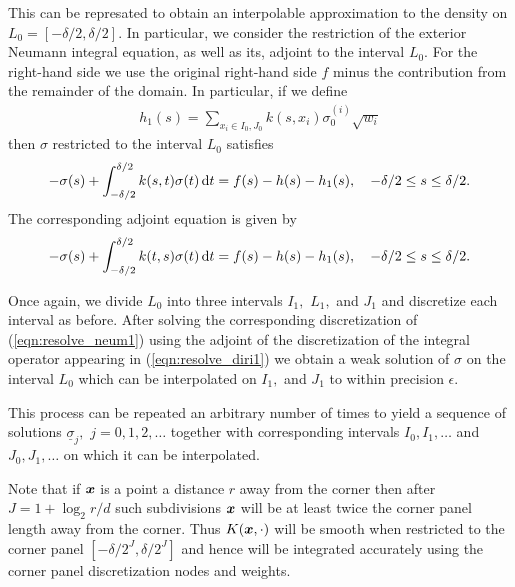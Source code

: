 This can be represated to obtain an interpolable approximation to the density on $L_0 = [-\delta/2,\delta/2].$ In particular, we consider the restriction of the exterior Neumann integral equation, as well as its, adjoint to the interval $L_0.$ For the right-hand side we use the original right-hand side $f$ minus the contribution from the remainder of the domain. In particular, if we define
\begin{align}
h_1(s) = \sum_{x_i \in I_0,J_0} k(s,x_i) \sigma_0^{(i)} \sqrt{w_i}
\end{align}
then $\sigma$ restricted to the interval $L_0$ satisfies
\begin{align}\label{eqn:resolve_neum1}
-\sigma(s) + \int_{-\delta/2}^{\delta/2} k(s,t) \sigma(t)\,{\rm d} t = f(s)-h(s)-h_1(s), \quad -\delta/2 \le s \le \delta/2.
\end{align}
The corresponding adjoint equation is given by 
\begin{align}\label{eqn:resolve_diri1}
-\sigma(s) + \int_{-\delta/2}^{\delta/2} k(t,s) \sigma(t)\,{\rm d} t = f(s)-h(s)-h_1(s), \quad -\delta/2 \le s \le \delta/2.
\end{align}

Once again, we divide $L_0$ into three intervals $I_1,$ $L_1,$ and $J_1$ and discretize each interval as before. After solving the corresponding discretization of (\ref{eqn:resolve_neum1}) using the adjoint of the discretization of the integral operator appearing in (\ref{eqn:resolve_diri1}) we obtain a weak solution of $\sigma$ on the interval $L_0$ which can be interpolated on $I_1,$ and $J_1$ to within precision $\epsilon.$

This process can be repeated an arbitrary number of times to yield a sequence of solutions $\underline{\sigma}_j,$ $j=0,1,2,\dots$ together with corresponding intervals $I_0,I_1,\dots$ and $J_0,J_1,\dots$ on which it can be interpolated.

Note that if $\boldsymbol{x}$ is a point a distance $r$ away from the corner then after $J=1+\log_2 r/d$ such subdivisions $\boldsymbol{x}$ will be at least twice the corner panel length away from the corner. Thus $K(\boldsymbol{x},\cdot)$ will be smooth when restricted to the corner panel $[-\delta/2^{J},\delta/2^J]$ and hence will be integrated accurately using the corner panel discretization nodes and weights.
